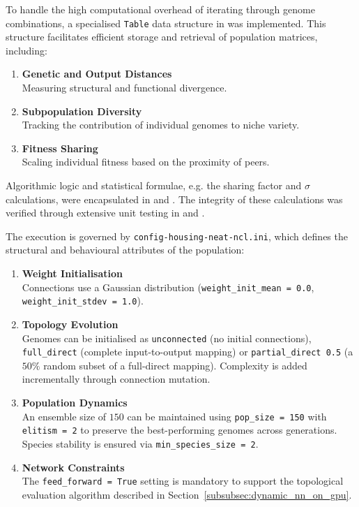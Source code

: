 To handle the high computational overhead of iterating through genome combinations, a specialised \texttt{Table} data structure in  was implemented. This structure facilitates efficient storage and retrieval of population matrices, including: 
\begin{enumerate}
    \item \textbf{Genetic and Output Distances} \\
    Measuring structural and functional divergence. 

    \item \textbf{Subpopulation Diversity} \\
    Tracking the contribution of individual genomes to niche variety. 

    \item \textbf{Fitness Sharing} \\
    Scaling individual fitness based on the proximity of peers. 
\end{enumerate}

Algorithmic logic and statistical formulae, e.g. the sharing factor and $\sigma$ calculations, were encapsulated in  and . The integrity of these calculations was verified through extensive unit testing in  and . 

The execution is governed by \texttt{config-housing-neat-ncl.ini}, which defines the structural and behavioural attributes of the population: 
\begin{enumerate}
    \item \textbf{Weight Initialisation} \\
    Connections use a Gaussian distribution (\lstinline|weight_init_mean = 0.0|, \lstinline|weight_init_stdev = 1.0|). 

    \item \textbf{Topology Evolution} \\
    Genomes can be initialised as \lstinline|unconnected| (no initial connections), \lstinline|full_direct| (complete input-to-output mapping) or \lstinline|partial_direct 0.5| (a $50\%$ random subset of a full-direct mapping). Complexity is added incrementally through connection mutation. 

    \item \textbf{Population Dynamics} \\
    An ensemble size of $150$ can be maintained using \lstinline|pop_size = 150| with \lstinline|elitism = 2| to preserve the best-performing genomes across generations. Species stability is ensured via \lstinline|min_species_size = 2|. 

    \item \textbf{Network Constraints} \\
    The \lstinline|feed_forward = True| setting is mandatory to support the topological evaluation algorithm described in Section~\ref{subsubsec:dynamic_nn_on_gpu}. 
\end{enumerate}

